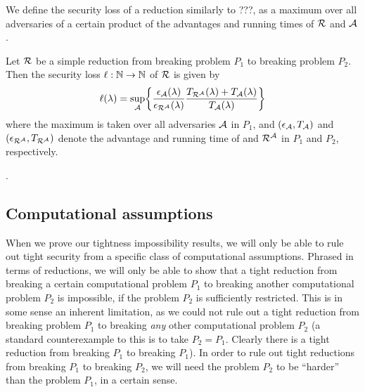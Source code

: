 We define the security loss of a reduction \redR similarly to ???,
as a maximum over all adversaries \advA of a certain product of the
advantages and running times of \(\redR\) and \(\mathcal{A}\).

\begin{definition}\label{def:loss}
  Let \(\redR\) be a simple reduction
  from breaking problem \(P_{1}\) to breaking problem \(P_{2}\).
  Then the security loss \(\ell : \mathbb{N} \to \mathbb{N}\) of \(\redR\) is given by
  \begin{equation}
    \ell(\lambda) = \sup_{\advA} \left\{ \frac{\epsilon_{\advA}(\lambda)}{\epsilon_{\redR^{\advA}}(\lambda)}\frac{T_{\redR^{\advA}}(\lambda) + T_{\advA}(\lambda)}{T_{\advA}(\lambda)} \right\}
  \end{equation}
  where the maximum is taken over all adversaries \(\mathcal{A}\) in \(P_{1}\),
  and \((\epsilon_{\mathcal{A}}, T_{\mathcal{A}})\) and \((\epsilon_{\redR^{\advA}}, T_{\redR^{\advA}})\)
  denote the advantage and running time of \advA and \(\redR^{\advA}\) in \(P_{1}\) and \(P_{2}\), respectively.
\end{definition}

.


\subsection{Computational assumptions}

When we prove our tightness impossibility results,
we will only be able to rule out tight security
from a specific class of computational assumptions.
Phrased in terms of reductions,
we will only be able to show that a tight reduction
from breaking a certain computational problem \(P_1\)
to breaking another computational problem \(P_2\) is impossible,
if the problem \(P_2\) is sufficiently restricted.
This is in some sense an inherent limitation,
as we could not rule out a tight reduction from breaking problem \(P_1\)
to breaking \emph{any} other computational problem \(P_2\)
(a standard counterexample to this is to take \(P_2 = P_1\).
Clearly there is a tight reduction from breaking \(P_1\) to breaking \(P_1\)).
In order to rule out tight reductions from breaking \(P_1\) to breaking \(P_2\),
we will need the problem \(P_2\) to be ``harder''
than the problem \(P_1\), in a certain sense.


